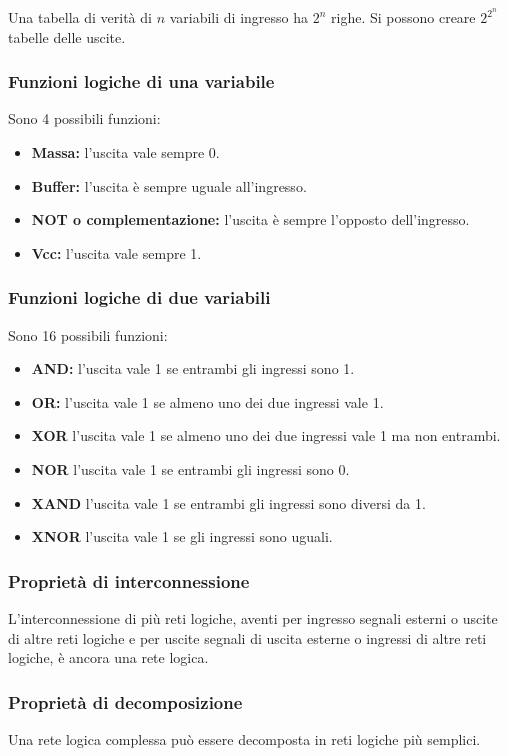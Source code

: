 \documentclass{article}
\begin{document}
Una tabella di verità di $n$ variabili di ingresso ha $2^n$ righe. Si possono creare $2^{2^n}$ tabelle delle uscite.

\subsubsection{Funzioni logiche di una variabile}
Sono 4 possibili funzioni:
\begin{itemize}
    \item \textbf{Massa:} l'uscita vale sempre 0.
    \item \textbf{Buffer:} l'uscita è sempre uguale all'ingresso.
    \item \textbf{NOT o complementazione:} l'uscita è sempre l'opposto dell'ingresso.
    \item \textbf{Vcc:} l'uscita vale sempre 1.
\end{itemize}

\subsubsection{Funzioni logiche di due variabili}
Sono 16 possibili funzioni:
\begin{itemize}
    \item \textbf{AND:} l'uscita vale 1 se entrambi gli ingressi sono 1.
    \item \textbf{OR:} l'uscita vale 1 se almeno uno dei due ingressi vale 1.
    \item \textbf{XOR} l'uscita vale 1 se almeno uno dei due ingressi vale 1 ma non entrambi.
    \item \textbf{NOR} l'uscita vale 1 se entrambi gli ingressi sono 0.
    \item \textbf{XAND} l'uscita vale 1 se entrambi gli ingressi sono diversi da 1.
    \item \textbf{XNOR} l'uscita vale 1 se gli ingressi sono uguali.
\end{itemize}

\subsubsection{Proprietà di interconnessione}
L’interconnessione di più reti logiche, aventi per ingresso segnali esterni o uscite di altre reti logiche e per uscite segnali di uscita esterne o ingressi di altre reti logiche, è ancora una rete logica.

\subsubsection{Proprietà di decomposizione}
Una rete logica complessa può essere decomposta in reti logiche più semplici.
\end{document}
